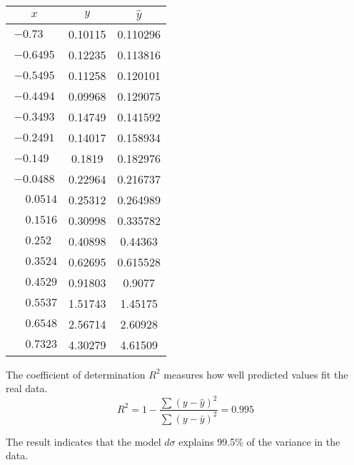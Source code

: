 \documentclass[12pt]{article}
\begin{document}
\begin{center}
\begin{tabular}{|c|c|c|}
\hline
$x$ & $y$ & $\hat{y}$\\
\hline
$-0.73\phantom{00}$ & 0.10115 & 0.110296\\
$-0.6495$ & 0.12235 & 0.113816\\
$-0.5495$ & 0.11258 & 0.120101\\
$-0.4494$ & 0.09968 & 0.129075\\
$-0.3493$ & 0.14749 & 0.141592\\
$-0.2491$ & 0.14017 & 0.158934\\
$-0.149\phantom{0}$ & 0.1819\phantom{0} & 0.182976\\
$-0.0488$ & 0.22964 & 0.216737\\
$\phantom{+}0.0514$ & 0.25312 & 0.264989\\
$\phantom{+}0.1516$ & 0.30998 & 0.335782\\
$\phantom{+}0.252\phantom{0}$ & 0.40898 & 0.44363\phantom{0}\\
$\phantom{+}0.3524$ & 0.62695 & 0.615528\\
$\phantom{+}0.4529$ & 0.91803 & 0.9077\phantom{00}\\
$\phantom{+}0.5537$ & 1.51743 & 1.45175\phantom{0}\\
$\phantom{+}0.6548$ & 2.56714 & 2.60928\phantom{0}\\
$\phantom{+}0.7323$ & 4.30279 & 4.61509\phantom{0}\\
\hline
\end{tabular}
\end{center}

\noindent
The coefficient of determination $R^2$ measures how well predicted values fit the real data.
\begin{equation*}
R^2=1-\frac{\sum(y-\hat{y})^2}{\sum(y-\bar{y})^2}=0.995
\end{equation*}

\noindent
The result indicates that the model $d\sigma$ explains 99.5\% of the variance in the data.
\end{document}
